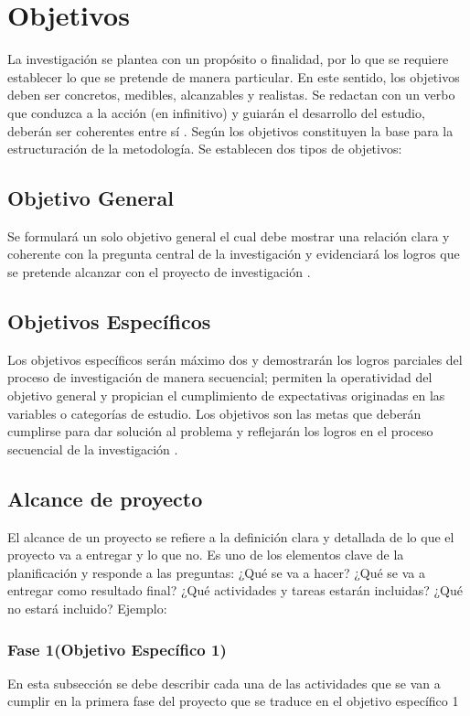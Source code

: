 

\clearpage
\section{Objetivos}
La investigación se plantea con un propósito o finalidad, por lo que se requiere establecer lo que se pretende de manera particular. En este sentido, los objetivos deben ser concretos, medibles, alcanzables y realistas. Se redactan con un verbo que conduzca a la acción (en infinitivo) y guiarán el desarrollo del estudio, deberán ser coherentes entre sí \cite{ejemplo2020}. Según \cite{ejemplo2022} los objetivos constituyen la base para la estructuración de la metodología. Se establecen dos tipos de objetivos:
\subsection{Objetivo General}
Se formulará un solo objetivo general el cual debe mostrar una relación clara y coherente con la pregunta central de la investigación y evidenciará los logros que se pretende alcanzar con el proyecto de investigación \cite{ejemplo2021}.
\subsection{Objetivos Específicos}
Los objetivos específicos serán máximo dos y demostrarán los logros parciales del proceso de investigación de manera secuencial; permiten la operatividad del objetivo general y propician el cumplimiento de expectativas originadas en las variables o categorías de estudio. Los objetivos son las metas que deberán cumplirse para dar solución al problema y reflejarán los logros en el proceso secuencial de la investigación \cite{ejemplo2020}.
\subsection{Alcance de proyecto}
El alcance de un proyecto se refiere a la definición clara y detallada de lo que el proyecto va a entregar y lo que no. Es uno de los elementos clave de la planificación y responde a las preguntas:
    ¿Qué se va a hacer?
    ¿Qué se va a entregar como resultado final?
    ¿Qué actividades y tareas estarán incluidas?
    ¿Qué no estará incluido?
Ejemplo:

\subsubsection{Fase 1(Objetivo Específico 1)}
En esta subsección se debe describir cada una de las actividades que se van a cumplir en la primera fase del proyecto que se traduce en el objetivo específico 1
